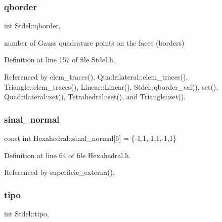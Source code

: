 \mbox{\label{classStdel_a63a106b928d211c71d5fec6449ef4d51}} 
\subsubsection{\texorpdfstring{qborder}{qborder}}
{\footnotesize\ttfamily int Stdel\+::qborder\hspace{0.3cm}{\ttfamily [protected]}, {\ttfamily [inherited]}}



number of Gauss quadrature points on the faces (borders) 



Definition at line 157 of file Stdel.\+h.



Referenced by elem\+\_\+traces(), Quadrilateral\+::elem\+\_\+traces(), Triangle\+::elem\+\_\+traces(), Linear\+::\+Linear(), Stdel\+::qborder\+\_\+val(), set(), Quadrilateral\+::set(), Tetrahedral\+::set(), and Triangle\+::set().

\mbox{\label{classHexahedral_a20e8fb8b0d5bbe0b16676290f82324cf}} 
\subsubsection{\texorpdfstring{sinal\+\_\+normal}{sinal\_normal}}
{\footnotesize\ttfamily const int Hexahedral\+::sinal\+\_\+normal\mbox{[}6\mbox{]} = \{-\/1,1,-\/1,1,-\/1,1\}\hspace{0.3cm}{\ttfamily [private]}}



Definition at line 64 of file Hexahedral.\+h.



Referenced by superficie\+\_\+externa().

\mbox{\label{classStdel_a68f8781a42728758ccde39e15cd319ed}} 
\subsubsection{\texorpdfstring{tipo}{tipo}}
{\footnotesize\ttfamily int Stdel\+::tipo\hspace{0.3cm}{\ttfamily [protected]}, {\ttfamily [inherited]}}



